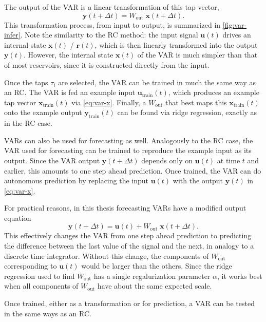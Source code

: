 The output of the VAR is a linear transformation of this tap vector,
\begin{equation}
  \label{eq:var-y}
  \bm{y}(t + \Delta t) = W_\text{out}\;\bm{x}(t + \Delta t).
\end{equation}
This transformation process, from input to output, is summarized in
\cref{fig:var-infer}. Note the similarity to the RC method: the input
signal $\bm{u}(t)$ drives an internal state $\bm{x}(t)$ / $\bm{r}(t)$,
which is then linearly transformed into the output
$\bm{y}(t)$. However, the internal state $\bm{x}(t)$ of the VAR is
much simpler than that of most reservoirs, since it is constructed
directly from the input.

Once the taps $\tau_i$ are selected, the VAR can be trained in much
the same way as an RC. The VAR is fed an example input
$\bm{u}_\text{train}(t)$, which produces an example tap vector
$\bm{x}_\text{train}(t)$ via \cref{eq:var-x}. Finally, a $W_\text{out}$
that best maps this $\bm{x}_\text{train}(t)$ onto the example output
$\bm{y}_\text{train}(t)$ can be found via ridge regression, exactly as
in the RC case.

VARs can also be used for forecasting as well. Analogously to the RC
case, the VAR used for forecasting can be trained to reproduce the
example input as its output. Since the VAR output $\bm{y}(t + \Delta
t)$ depends only on $\bm{u}(t)$ at time $t$ and earlier, this amounts
to one step ahead prediction. Once trained, the VAR can do autonomous
prediction by replacing the input $\bm{u}(t)$ with the output
$\bm{y}(t)$ in \cref{eq:var-x}.

For practical reasons, in this thesis forecasting VARs have a modified
output equation
\begin{equation}
  \bm{y}(t + \Delta t) = \bm{u}(t) + W_\text{out}\;\bm{x}(t + \Delta t).
\end{equation}
This effectively changes the VAR from one step ahead prediction to
predicting the difference between the last value of the signal and the
next, in analogy to a discrete time integrator. Without this change,
the components of $W_\text{out}$ corresponding to $\bm{u}(t)$ would be
larger than the others. Since the ridge regression used to find
$W_\text{out}$ has a single regalurization parameter $\alpha$, it
works best when all components of $W_\text{out}$ have about the same
expected scale.

Once trained, either as a transformation or for prediction, a VAR can
be tested in the same ways as an RC.


